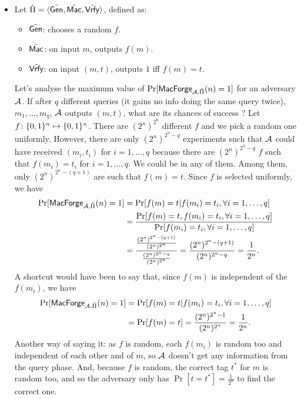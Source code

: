 \begin{solution}
  \begin{itemize}
    \item
      Let $\tilde{\Pi} = \langle \tilde{\operatorname{\mathsf{Gen}}}, \tilde{\operatorname{\mathsf{Mac}}}, \tilde{\operatorname{\mathsf{Vrfy}}} \rangle$, defined as:
      \begin{itemize}
        \item $\tilde{\operatorname{\mathsf{Gen}}}$: chooses a random $f$.
        \item $\tilde{\operatorname{\mathsf{Mac}}}$: on input $m$, outputs $f(m)$.
        \item $\tilde{\operatorname{\mathsf{Vrfy}}}$: on input $(m,t)$, outputs $1$ iff $f(m) = t$.
      \end{itemize}

      Let's analyse the maximum value of $\Pr[\mathsf{MacForge}_{\mathcal{A}, \tilde{\Pi}}(n) = 1]$ for an adversary $\mathcal{A}$.
      If after $q$ different queries (it gains no info doing the same query twice),
      $m_1, \dots, m_q$, $\mathcal{A}$ outputs $(m, t)$, what are its chances of success ?
      Let $f \colon \{0, 1\}^n \mapsto \{0, 1\}^n$.
      There are $(2^n)^{2^n}$ different $f$ and we pick a random one uniformly.
      However, there are only $(2^n)^{2^n-q}$ experiments such that $\mathcal{A}$ could have received $(m_i,t_i)$ for $i = 1, \ldots, q$ because
      there are $(2^n)^{2^n-q}$ $f$ such that $f(m_i) = t_i$ for $i = 1, \ldots, q$.
      We could be in any of them.
      Among them, only $(2^n)^{2^n-(q+1)}$ are such that $f(m) = t$.
      Since $f$ is selected uniformly, we have
      \begin{align*}
        \Pr[\mathsf{MacForge}_{\mathcal{A}, \tilde{\Pi}}(n) = 1]
        & = \Pr[f(m) = t | f(m_i) = t_i, \forall i = 1, \ldots, q]\\
        & = \frac{\Pr[f(m) = t, f(m_i) = t_i, \forall i = 1, \ldots, q]}{\Pr[f(m_i) = t_i, \forall i = 1, \ldots, q]}\\
        & = \frac{\frac{(2^n)^{2^n-(q+1)}}{(2^n)^{2^n}}}{\frac{(2^n)^{2^n-q}}{(2^n)^{2^n}}}
          = \frac{(2^n)^{2^n-(q+1)}}{(2^n)^{2^n-q}}
          = \frac{1}{2^n}.
      \end{align*}
      A shortcut would have been to say that, since $f(m)$ is independent of the $f(m_i)$, we have
      \begin{align*}
        \Pr[\mathsf{MacForge}_{\mathcal{A}, \tilde{\Pi}}(n) = 1]
        & = \Pr[f(m) = t | f(m_i) = t_i, \forall i = 1, \ldots, q]\\
        & = \Pr[f(m) = t]
          = \frac{(2^n)^{2^n-1}}{(2^n)^{2^n}}
          = \frac{1}{2^n}.
      \end{align*}
      Another way of saying it: as $f$ is random, each $f(m_i)$ is random too and independent of each other and of $m$, so $\mathcal{A}$ doesn't get any information from the query phase. And, because $f$ is random, the correct tag $t^*$ for $m$ is random too, and so the adversary only has $\Pr[t=t^*]=\frac{1}{2^n}$ to find the correct one.


\end{itemize}
\end{solution}
